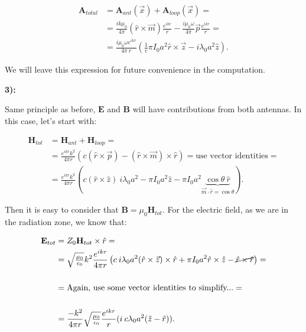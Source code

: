 \begin{equation}
	\begin{split}
		\mathbf{A}_{total} &= \mathbf{A}_{ant}(\vec{x}) + \mathbf{A}_{loop}(\vec{x}) =\\
		&= \frac{ik\mu_{0}}{4\pi}(\hat{r}\times\vec{m})\frac{e^{ikr}}{r} - \frac{i\mu_{0}\omega}{4\pi}\vec{p} \frac{e^{ikr}}{r}=\\
		&= \frac{i\mu_{0}\omega e^{ikr}}{4\pi \:r} \left(\tfrac{1}{c}\pi I_{0} a^{2} \hat{r}\times \vec{z} - i\lambda_{0}a^{2}\hat{z}\right).
	\end{split}
\end{equation}

We will leave this expression for future convenience in the computation.

\textbf{3):}
	
Same principle as before, $\mathbf{E}$ and $\mathbf{B}$ will have contributions from both antennas. In this case, let's start with:

\begin{equation}\label{magneticfield}
	\begin{split}
		\mathbf{H}_{tot} &= \mathbf{H}_{ant} + \mathbf{H}_{loop}=\\
		&= \frac{e^{ikr}k^{2}}{4\pi r} \left(c(\hat{r}\times \vec{p}) - (\hat{r}\times \vec{m})\times \hat{r}\right) = \text{use vector identities} = \\
		&= \frac{e^{ikr}k^{2}}{4\pi r}\left(c(\hat{r}\times \hat{z})\: i\lambda_{0}a^{2} - \pi I_{0} a^{2}\hat{z}- \pi I_{0}a^{2}\underbrace{\cos\theta \: \hat{r}}_{\vec{m}\cdot \hat{r}= \cos\theta}\right).
	\end{split}
\end{equation}

Then it is easy to consider that $\mathbf{B} = \mu_{0} \mathbf{H}_{tot}$. For the electric field, as we are in the radiation zone, we know that:

\begin{equation}
	\begin{split}
		\mathbf{E}_{tot} &= Z_{0} \mathbf{H}_{tot} \times \hat{r} = \\
		&= \sqrt{\tfrac{\mu_{0}}{\epsilon_{0}}}k^{2} \frac{e^{ikr}}{4\pi r}\left(c\: i\lambda_{0}a^{2}(\hat{r}\times\vec{z})\times\hat{r} + \pi I_{0}a^{2}\hat{r}\times \hat{z}- \cancel{\hat{r}\times\hat{r}}\right)=\\
		&\\
		&=\text{Again, use some vector identities to simplify...}=\\
		&\\
		&=\frac{-k^{2}}{4\pi r}\sqrt{\tfrac{\mu_{0}}{\epsilon_{0}}}\frac{e^{ikr}}{r}(i\: c\lambda_{0}a^{2}(\hat{z}-\hat{r})).
	\end{split}
\end{equation}

